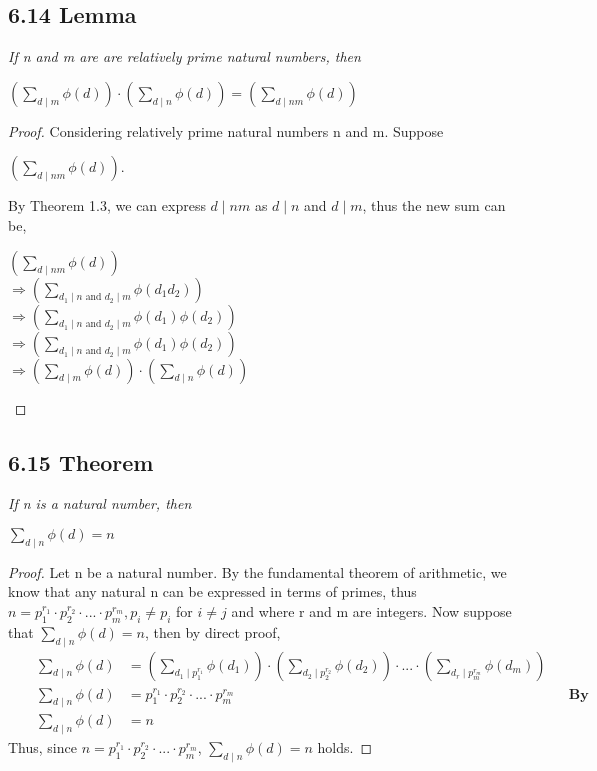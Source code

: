 \documentclass{article}
\begin{document}
\subsection*{6.14 Lemma} 
\quad \textit{If n and m are are relatively prime natural numbers, then}
\begin{center}
    $(\sum_{d \mid m} \phi(d)) \cdot (\sum_{d \mid n} \phi(d)) = (\sum_{d \mid nm} \phi(d))$
\end{center}

\begin{proof}
Considering relatively prime natural numbers n and m. Suppose 
\begin{center}
    $(\sum_{d \mid nm} \phi(d))$.
\end{center}  
By Theorem 1.3, we can express $d\mid nm$ as $d \mid n$ and $d \mid m$, thus the new sum can be,
\begin{center}
    $(\sum_{d \mid nm} \phi(d))$\\
    $\Longrightarrow (\sum_{d_1 \mid n \text{ and } d_2 \mid m} \phi(d_1d_2))$\\
    $\Longrightarrow (\sum_{d_1 \mid n \text{ and } d_2 \mid m} \phi(d_1) \phi(d_2))$\\
    $\Longrightarrow (\sum_{d_1 \mid n \text{ and } d_2 \mid m} \phi(d_1) \phi(d_2))$\\
    $\Longrightarrow (\sum_{d \mid m} \phi(d)) \cdot (\sum_{d \mid n} \phi(d))$
\end{center}
\end{proof}

\subsection*{6.15 Theorem} 
\quad \textit{If n is a natural number, then}
\begin{center}
    $\sum_{d \mid n} \phi(d) = n$
\end{center}

\begin{proof}
Let n be a natural number. By the fundamental theorem of arithmetic, we know that any natural n can be expressed in terms of primes, thus $n = p_1^{r_1} \cdot p_2^{r_2} \cdot ... \cdot p_m^{r_m}, p_i \neq p_i$ for $i \neq j$ and where r and m are integers. Now suppose that $\sum_{d \mid n} \phi(d) = n$, then by direct proof,
\begin{align*}
    &&\sum_{d \mid n} \phi(d) &= (\sum_{d_1 \mid p_1^{r_1}} \phi(d_1)) \cdot (\sum_{d_2 \mid p_2^{r_2}} \phi(d_2)) \cdot ... \cdot (\sum_{d_r \mid p_m^{r_m}} \phi(d_m))&&\\
    &&\sum_{d \mid n} \phi(d) &= p_1^{r_1} \cdot p_2^{r_2} \cdot ... \cdot p_m^{r_m}&& \textbf{By Lemma 6.12}\\
    &&\sum_{d \mid n} \phi(d) &= n&&
\end{align*}
Thus, since $n = p_1^{r_1} \cdot p_2^{r_2} \cdot ... \cdot p_m^{r_m}$, $\sum_{d \mid n} \phi(d) = n$ holds.
\end{proof}
\end{document}
